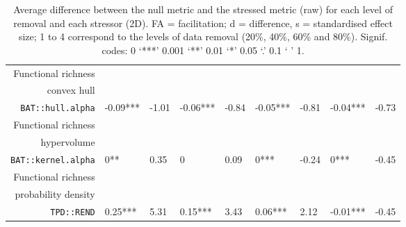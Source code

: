 \begin{table}[ht]
\begin{tabular}{rllllllll}
  Functional richness\\convex hull\\\texttt{BAT::hull.alpha} & -0.09*** & -1.01 & -0.06*** & -0.84 & -0.05*** & -0.81 & -0.04*** & -0.73 \\ 
  Functional richness\\hypervolume\\\texttt{BAT::kernel.alpha} & 0** & 0.35 & 0 & 0.09 & 0*** & -0.24 & 0*** & -0.45 \\ 
  Functional richness\\probability density\\\texttt{TPD::REND} & 0.25*** & 5.31 & 0.15*** & 3.43 & 0.06*** & 2.12 & -0.01*** & -0.45 \\ 
   \hline
\end{tabular}
\caption{Average difference between the null metric and the stressed metric (raw) for each level of removal and each stressor (2D). FA = facilitation; d = difference, s = standardised effect size; 1 to 4 correspond to the levels of data removal (20\%, 40\%, 60\% and 80\%). Signif. codes:  0 ‘***’ 0.001 ‘**’ 0.01 ‘*’ 0.05 ‘.’ 0.1 ‘ ’ 1.} 
\end{table}
